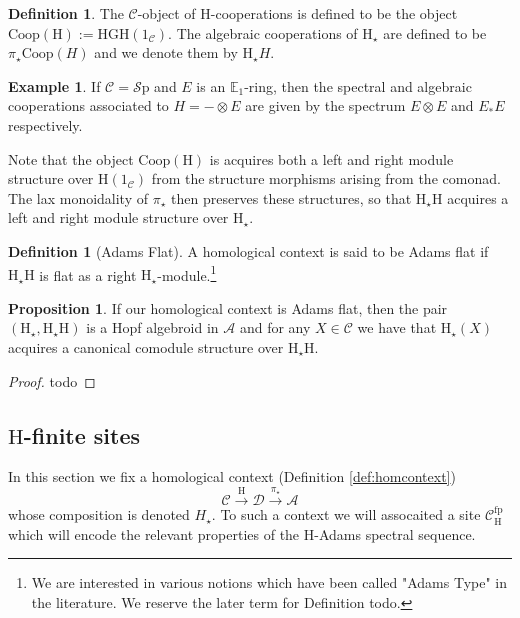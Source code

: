\documentclass[10pt]{amsart}
\theoremstyle{definition}
\numberwithin{figure}{section}
\numberwithin{equation}{section}
\newtheorem{proposition}[figure]{Proposition}
\newtheorem{definition}[figure]{Definition}
\newtheorem{example}[figure]{Example}
\newcommand{\cA}{\mathcal{A}}
\newcommand{\cC}{\mathcal{C}}
\newcommand{\cD}{\mathcal{D}}
\newcommand{\one}{\mathrm{1}}
\theoremstyle{cited}
\newcommand{\bE}{\mathbb{E}}
\newcommand{\Sp}{{\mathcal{S}\mathrm{p}}}
\newcommand{\fp}{\mathrm{fp}}
\renewcommand{\H}{\mathrm{H}}
\newcommand{\G}{\mathrm{G}}
\newcommand{\Coop}{\mathrm{Coop}}
\begin{document}
\begin{definition}
  The $\cC$-object of $\H$-cooperations is defined to be the object $\Coop(\H):=\H\G\H(\one_{\cC})$. The algebraic cooperations of $\H_\star$ are defined to be $\pi_\star\Coop(H)$ and we denote them by $\H_\star H$.
\end{definition}

\begin{example}
  If $\cC=\Sp$ and $E$ is an $\bE_1$-ring, then the spectral and algebraic cooperations associated to $H=-\otimes E$ are given by the spectrum $E\otimes E$ and $E_*E$ respectively.
\end{example}

Note that the object $\Coop(\H)$ is acquires both a left and right module structure over $\H(\one_{\cC})$ from the structure morphisms arising from the comonad. The lax monoidality of $\pi_\star$ then preserves these structures, so that $\H_\star \H$ acquires a left and right module structure over $\H_\star$.

\begin{definition}[Adams Flat]
  A homological context is said to be Adams flat if $\H_\star \H$ is flat as a right $\H_\star$-module.\footnote{We are interested in various notions which have been called "Adams Type" in the literature. We reserve the later term for Definition {todo}.}
\end{definition}

\begin{proposition}
  If our homological context is Adams flat, then the pair $(\H_\star, \H_\star\H)$ is a Hopf algebroid in $\cA$ and for any $X\in \cC$ we have that $\H_\star(X)$ acquires a canonical comodule structure over $\H_\star \H$.
\end{proposition}

\begin{proof}
  todo
\end{proof}

\subsection{$\H$-finite sites}

In this section we fix a homological context (Definition \ref{def:homcontext})
\[
\cC\xrightarrow{\H} \cD \xrightarrow{\pi_\star} \cA
\]
whose composition is denoted $H_\star$. To such a context we will assocaited a site $\cC_{\H}^\fp$ which will encode the relevant properties of the $\H$-Adams spectral sequence.
\end{document}
